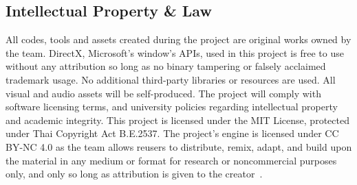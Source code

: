 \subsection{Intellectual Property \& Law}
\label{subsec:intellectual-property-and-law}

All codes, tools and assets created during the project are original works owned by the team.
DirectX, Microsoft's window’s APIs, used in this project is free to use without any attribution so long as no binary tampering or falsely acclaimed trademark usage.
No additional third-party libraries or resources are used.
All visual and audio assets will be self-produced.
The project will comply with software licensing terms, and university policies regarding intellectual property and academic integrity.
This project is licensed under the MIT License, protected under Thai Copyright Act B.E.2537.
The project's engine is licensed under CC BY-NC 4.0 as the team allows reusers to distribute, remix, adapt, and build upon the material in any medium or format for research or noncommercial purposes only,
and only so long as attribution is given to the creator~\cite{CreativeCommonsLicense}.

\label{tag:end}